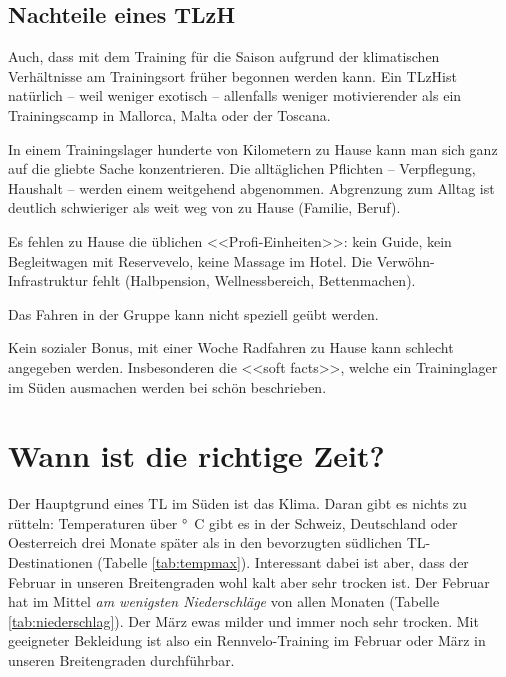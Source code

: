 \documentclass[a4paper,DIV13,BCOR0cm]{scrartcl}
\newcommand{\rv}{Rennvelo}
\newcommand{\tlzh}{TLzH}
\begin{document}
\subsection{Nachteile eines \tlzh}

Auch, dass mit dem Training für die Saison aufgrund der klimatischen Verhältnisse am Trainingsort früher begonnen werden kann.
Ein \tlzh ist natürlich -- weil weniger exotisch -- allenfalls weniger motivierender als ein Trainingscamp in Mallorca, Malta oder der Toscana.

In einem Trainingslager hunderte von Kilometern zu Hause kann man sich ganz auf die gliebte Sache konzentrieren.
Die alltäglichen Pflichten -- Verpflegung, Haushalt -- werden einem weitgehend abgenommen.
Abgrenzung zum Alltag ist deutlich schwieriger als weit weg von zu Hause (Familie, Beruf).

Es fehlen zu Hause die üblichen <<Profi-Einheiten>>: kein Guide, kein Begleitwagen mit Reservevelo, keine Massage im Hotel.
Die Verwöhn-Infrastruktur fehlt (Halbpension, Wellnessbereich, Bettenmachen).

Das Fahren in der Gruppe kann nicht speziell geübt werden.

Kein sozialer Bonus, mit einer Woche Radfahren zu Hause kann schlecht angegeben werden.
Insbesonderen die <<soft facts>>, welche ein Traininglager im Süden ausmachen werden bei 
schön beschrieben.

\section{Wann ist die richtige Zeit?}
\label{sec:richtigezeit}

Der Hauptgrund eines TL im Süden ist das Klima.
Daran gibt es nichts zu rütteln: Temperaturen über \unit[10]{\degree C} gibt es in der Schweiz, Deutschland oder Oesterreich
drei Monate später als in den bevorzugten südlichen TL-Destinationen (Tabelle \ref{tab:tempmax}).
Interessant dabei ist aber, dass der Februar in unseren Breitengraden
wohl kalt aber sehr trocken ist.
Der Februar hat im Mittel \textit{am wenigsten Niederschläge} von allen Monaten (Tabelle \ref{tab:niederschlag}).
Der März ewas milder und immer noch sehr trocken.
Mit geeigneter Bekleidung ist also ein \rv-Training im Februar oder März
in unseren Breitengraden durchführbar.
\end{document}
